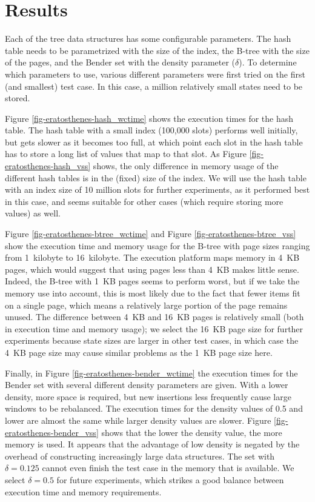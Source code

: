 \documentclass{acm_proc_article-sp}
\begin{document}

\section{Results}
Each of the tree data structures has some configurable parameters. The hash table
needs to be parametrized with the size of the index, the B-tree with the size of
the pages, and the Bender set with the density parameter ($\delta$). To determine
which parameters to use, various different parameters were first tried on the
first (and smallest) test case. In this case, a million relatively small states
need to be stored.

Figure \ref{fig-eratosthenes-hash_wctime} shows the execution times for the hash
table.
The hash table
with a small index (100,000 slots) performs well initially, but gets slower as
it becomes too full, at which point each slot in the hash table has to store a
long list of values that map to that slot.
As Figure \ref{fig-eratosthenes-hash_vss} shows, the only difference in memory
usage of the different hash tables is in the (fixed) size of the index.
We will use the hash table with an index size of 10 million slots for further
experiments, as it performed best in this case, and seems suitable for other
cases (which require storing more values) as well.

Figure \ref{fig-eratosthenes-btree_wctime} and Figure
\ref{fig-eratosthenes-btree_vss} show the execution time and memory usage
for the B-tree with page sizes ranging from 1~kilobyte to 16~kilobyte.
The execution platform
maps memory in 4~KB pages, which would suggest that using pages less than 4~KB
makes little sense. Indeed, the B-tree with 1~KB pages seems to perform worst,
but if we take the memory use into account, this is most likely due to the fact
that fewer items fit on a single page, which means a relatively large portion of
the page remains unused.
The difference between 4~KB and 16~KB pages is relatively small (both in
execution time and memory usage); we select the 16~KB page size for further
experiments because state sizes are larger in other test cases, in which case
the 4~KB page size may cause similar problems as the 1~KB page size here.

Finally, in Figure \ref{fig-eratosthenes-bender_wctime} the execution times for
the Bender set with several different density parameters are given. With a lower
density, more space is required, but new insertions less frequently cause large windows to be rebalanced.
The execution times for the density values of 0.5 and lower are almost the same
while larger density values are slower.
Figure \ref{fig-eratosthenes-bender_vss} shows that the lower the density value,
the more memory is used. It appears that the advantage of low density is
negated by the overhead of constructing increasingly large data structures.
The set with $\delta=0.125$ cannot even finish the test case in the memory
that is available. We select $\delta=0.5$ for future experiments, which strikes
a good balance between execution time and memory requirements.
\end{document}
